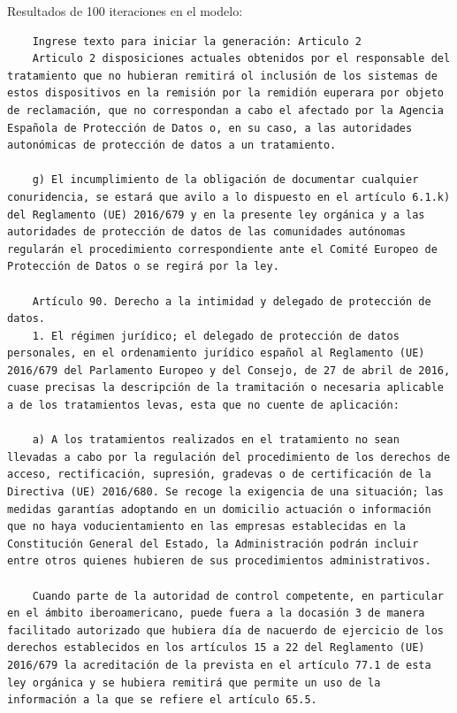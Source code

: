 \documentclass{article}
\begin{document}
Resultados de 100 iteraciones en el modelo:
{\scriptsize
\begin{verbatim}
    Ingrese texto para iniciar la generación: Articulo 2
    Articulo 2 disposiciones actuales obtenidos por el responsable del tratamiento que no hubieran remitirá ol inclusión de los sistemas de estos dispositivos en la remisión por la remidión euperara por objeto de reclamación, que no correspondan a cabo el afectado por la Agencia Española de Protección de Datos o, en su caso, a las autoridades autonómicas de protección de datos a un tratamiento.
    
    g) El incumplimiento de la obligación de documentar cualquier conuridencia, se estará que avilo a lo dispuesto en el artículo 6.1.k) del Reglamento (UE) 2016/679 y en la presente ley orgánica y a las autoridades de protección de datos de las comunidades autónomas regularán el procedimiento correspondiente ante el Comité Europeo de Protección de Datos o se regirá por la ley.
    
    Artículo 90. Derecho a la intimidad y delegado de protección de datos.
    1. El régimen jurídico; el delegado de protección de datos personales, en el ordenamiento jurídico español al Reglamento (UE) 2016/679 del Parlamento Europeo y del Consejo, de 27 de abril de 2016, cuase precisas la descripción de la tramitación o necesaria aplicable a de los tratamientos levas, esta que no cuente de aplicación:
    
    a) A los tratamientos realizados en el tratamiento no sean llevadas a cabo por la regulación del procedimiento de los derechos de acceso, rectificación, supresión, gradevas o de certificación de la Directiva (UE) 2016/680. Se recoge la exigencia de una situación; las medidas garantías adoptando en un domicilio actuación o información que no haya voducientamiento en las empresas establecidas en la Constitución General del Estado, la Administración podrán incluir entre otros quienes hubieren de sus procedimientos administrativos.
    
    Cuando parte de la autoridad de control competente, en particular en el ámbito iberoamericano, puede fuera a la docasión 3 de manera facilitado autorizado que hubiera día de nacuerdo de ejercicio de los derechos establecidos en los artículos 15 a 22 del Reglamento (UE) 2016/679 la acreditación de la prevista en el artículo 77.1 de esta ley orgánica y se hubiera remitirá que permite un uso de la información a la que se refiere el artículo 65.5.
    

\end{verbatim}}
\end{document}
